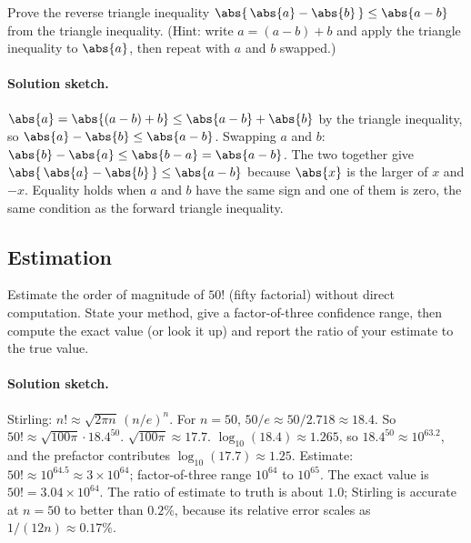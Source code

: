 \begin{exercise}
Prove the reverse triangle inequality $\abs{\,\abs{a} - \abs{b}\,}
\leq \abs{a - b}$ from the triangle inequality. (Hint: write $a = (a
- b) + b$ and apply the triangle inequality to $\abs{a}$, then
repeat with $a$ and $b$ swapped.)

\paragraph{Solution sketch.}
$\abs{a} = \abs{(a - b) + b} \leq \abs{a - b} + \abs{b}$ by the
triangle inequality, so $\abs{a} - \abs{b} \leq \abs{a - b}$.
Swapping $a$ and $b$: $\abs{b} - \abs{a} \leq \abs{b - a} = \abs{a - b}$.
The two together give $\abs{\,\abs{a} - \abs{b}\,} \leq \abs{a - b}$
because $\abs{x}$ is the larger of $x$ and $-x$. Equality holds when
$a$ and $b$ have the same sign and one of them is zero, the same
condition as the forward triangle inequality.
\end{exercise}

\subsection*{Estimation}

\begin{exercise}
Estimate the order of magnitude of $50!$ (fifty factorial) without
direct computation. State your method, give a factor-of-three
confidence range, then compute the exact value (or look it up) and
report the ratio of your estimate to the true value.

\paragraph{Solution sketch.}
Stirling: $n! \approx \sqrt{2 \pi n}\,(n/e)^{n}$. For $n = 50$,
$50/e \approx 50/2.718 \approx 18.4$. So $50! \approx \sqrt{100 \pi}
\cdot 18.4^{50}$. $\sqrt{100 \pi} \approx 17.7$. $\log_{10}(18.4)
\approx 1.265$, so $18.4^{50} \approx 10^{63.2}$, and the prefactor
contributes $\log_{10}(17.7) \approx 1.25$. Estimate: $50! \approx
10^{64.5} \approx 3 \times 10^{64}$; factor-of-three range $10^{64}$
to $10^{65}$. The exact value is $50! = 3.04 \times 10^{64}$. The
ratio of estimate to truth is about $1.0$; Stirling is accurate at
$n = 50$ to better than $0.2\%$, because its relative error scales
as $1/(12 n) \approx 0.17 \%$.
\end{exercise}

